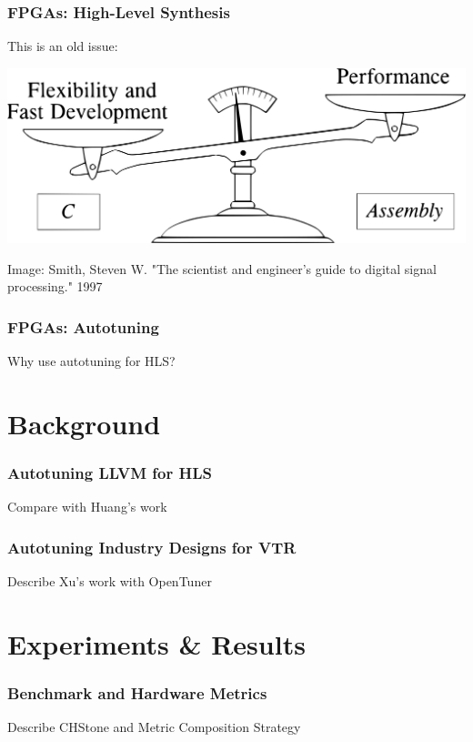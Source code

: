 \documentclass[10pt, compress, xcolor={table,xcdraw}, aspectratio=169]{beamer}
\begin{document}
\begin{frame}
    \frametitle{FPGAs: High-Level Synthesis}
    \begin{block}{This is an \alert{old issue}:}
    \begin{center}
        \includegraphics[width=.74\textwidth]{tradeoff_software}

        \scriptsize{Image: Smith, Steven W. "The scientist and engineer's guide
        to digital signal processing." 1997}
    \end{center}
    \end{block}
\end{frame}

\begin{frame}
    \frametitle{FPGAs: Autotuning}
    \begin{block}{Why use autotuning for HLS?}
    \end{block}
\end{frame}

\section{Background}

\begin{frame}
    \frametitle{Autotuning LLVM for HLS}
    \begin{block}{Compare with Huang's work}
    \end{block}
\end{frame}

\begin{frame}
    \frametitle{Autotuning Industry Designs for VTR}
    \begin{block}{Describe Xu's work with OpenTuner}
    \end{block}
\end{frame}

\section{Experiments \& Results}

\begin{frame}
    \frametitle{Benchmark and Hardware Metrics}
    \begin{block}{Describe CHStone and Metric Composition Strategy}
    \end{block}
\end{frame}
\end{document}

